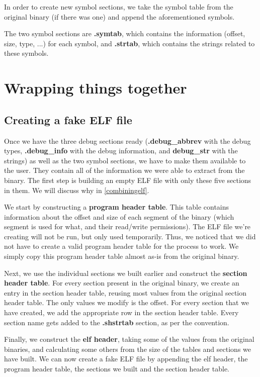 \documentclass[a4paper,11pt,oneside]{report}
\begin{document}
In order to create new symbol sections, we take the symbol table from the 
original binary (if there was one) and append the aforementioned symbols.

The two symbol sections are \textbf{.symtab}, which contains the information 
(offset, size, type, ...) for each symbol, and \textbf{.strtab}, which contains 
the strings related to these symbols.

\section{Wrapping things together}
\label{wrappingimplementation}

\subsection{Creating a fake ELF file}

Once we have the three debug sections ready
(\textbf{.debug\_abbrev} with the debug types, \textbf{.debug\_info} with the 
debug information, and \textbf{debug\_str} with the strings)
as well as the two symbol sections, we have to make them available to the user.
They contain all of the information we were able to extract from the binary.
The first step is building an empty ELF file with only these five sections in 
them. We will discuss why in \autoref{combiningelf}.

We start by constructing a \textbf{program header table}.
This table contains information about the offset and size of each segment of 
the binary (which segment is used for what, and their read/write permissions).
The ELF file we're creating will not be run, but only used temporarily.
Thus, we noticed that we did not have to create a valid program header table 
for the process to work.
We simply copy this program header table almost as-is from the original binary.

Next, we use the individual sections we built earlier and construct the 
\textbf{section header table}.
For every section present in the original binary, we create an entry in the 
section header table, reusing most values from the original section header 
table.
The only values we modify is the offset.
For every section that we have created, we add the appropriate row in the 
section header table.
Every section name gets added to the \textbf{.shstrtab} section, as per the 
convention.

Finally, we construct the \textbf{elf header}, taking some of the values from 
the original binaries, and calculating some others from the size of the tables 
and sections we have built.
We can now create a fake ELF file by appending the elf header, the program 
header table, the sections we built and the section header table.
\end{document}
